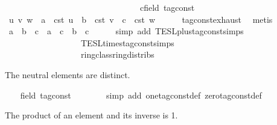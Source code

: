 \begin{isabellebody}
\ \ \ \ \ \ \ \ \ \ \ \ \ \ \ \ \ \ \ \ \ \ \ \ \ \ \ \ \ \ \ \ c{\isacharcolon}{\isacharcolon}{\isacartoucheopen}{\isacharprime}{\isasymtau}{\isacharcolon}{\isacharcolon}field\ tag{\isacharunderscore}const{\isacartoucheclose}\isanewline
\ \ \isamarkupfalse%
\ u\ v\ w\ \ {\isacartoucheopen}a\ {\isacharequal}\ {\isasymtau}\isactrlsub c\isactrlsub s\isactrlsub t\ u{\isacartoucheclose}\ \ {\isacartoucheopen}b\ {\isacharequal}\ {\isasymtau}\isactrlsub c\isactrlsub s\isactrlsub t\ v{\isacartoucheclose}\ \ {\isacartoucheopen}c\ {\isacharequal}\ {\isasymtau}\isactrlsub c\isactrlsub s\isactrlsub t\ w{\isacartoucheclose}\isanewline
\ \ \ \ \isamarkupfalse%
\ tag{\isacharunderscore}const{\isachardot}exhaust\ \isamarkupfalse%
\ metis\isanewline
\ \ \isamarkupfalse%
\ {\isacartoucheopen}{\isacharparenleft}a\ {\isacharplus}\ b{\isacharparenright}\ {\isacharasterisk}\ c\ {\isacharequal}\ a\ {\isacharasterisk}\ c\ {\isacharplus}\ b\ {\isacharasterisk}\ c{\isacartoucheclose}\isanewline
\ \ \ \ \isamarkupfalse%
\ {\isacharparenleft}simp\ add{\isacharcolon}\ TESL{\isachardot}plus{\isacharunderscore}tag{\isacharunderscore}const{\isachardot}simps\isanewline
\ \ \ \ \ \ \ \ \ \ \ \ \ \ \ \ \ \ TESL{\isachardot}times{\isacharunderscore}tag{\isacharunderscore}const{\isachardot}simps\isanewline
\ \ \ \ \ \ \ \ \ \ \ \ \ \ \ \ \ \ ring{\isacharunderscore}class{\isachardot}ring{\isacharunderscore}distribs{\isacharparenleft}{}{\isacharparenright}{\isacharparenright}\isanewline
{}\isamarkupfalse%
%
\begin{isamarkuptext}%
The neutral elements are distinct.%
\end{isamarkuptext}\isamarkuptrue%
\ \ \isamarkupfalse%
\ {\isacartoucheopen}{\isacharparenleft}{}{\isacharcolon}{\isacharcolon}{\isacharparenleft}{\isacharprime}{\isasymtau}{\isacharcolon}{\isacharcolon}field\ tag{\isacharunderscore}const{\isacharparenright}{\isacharparenright}\ {\isasymnoteq}\ {}{\isacartoucheclose}\isanewline
\ \ \ \ \isamarkupfalse%
\ {\isacharparenleft}simp\ add{\isacharcolon}\ one{\isacharunderscore}tag{\isacharunderscore}const{\isacharunderscore}def\ zero{\isacharunderscore}tag{\isacharunderscore}const{\isacharunderscore}def{\isacharparenright}\isanewline
{}\isamarkupfalse%
%
\begin{isamarkuptext}%
The product of an element and its inverse is 1.%

\end{isamarkuptext}
\end{isabellebody}
